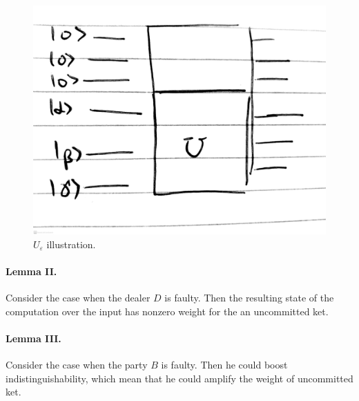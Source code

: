 \documentclass{article}
\begin{document}
\begin{figure}[H]
\includegraphics[scale=0.12]{images/avss protocol_3.jpg}
\caption{ \(U_{\varepsilon}\) illustration. }
    \label{fig:simulation_cases}
\end{figure}

\paragraph{Lemma II.} Consider the case when the dealer \(D\) is faulty. Then the resulting state of the computation over the input has nonzero weight for the an uncommitted ket.

\paragraph{Lemma III.} Consider the case when the party \(B\) is faulty. Then he could boost indistinguishability, which mean that he could amplify the weight of uncommitted ket.
\end{document}

